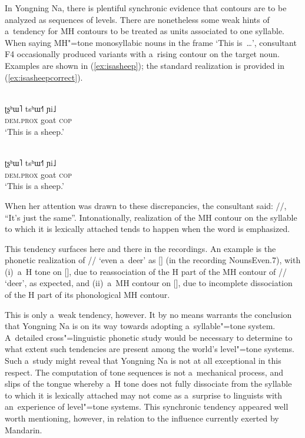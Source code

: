 In Yongning Na, there is plentiful synchronic evidence that contours are to be analyzed as sequences of
levels. There are nonetheless some weak hints of a~tendency for MH contours to be treated as units
associated to one syllable. When saying MH"=tone monosyllabic nouns in the frame ‘This is~{\dots}’,
consultant F4 occasionally produced variants with a~rising {contour} on the target noun. Examples are shown in (\ref{ex:isasheep}); the standard realization is provided in (\ref{ex:isasheepcorrect}).

\begin{exe}
	\ex
	\label{ex:isasheep}
	\\ 
		\gll ʈʂʰɯ˥		tsʰɯ˧˥	ɲi˩\\
		\textsc{dem.prox}	goat	\textsc{cop}\\
		\glt ‘This is a sheep.’ 
\end{exe}

\Hack{\newpage}

\begin{exe}
	\ex
	\label{ex:isasheepcorrect}
	\\ 
	\gll ʈʂʰɯ˥		tsʰɯ˧˥	ɲi˩\\
	\textsc{dem.prox}	goat	\textsc{cop}\\
	\glt ‘This is a sheep.’
\end{exe}

When her attention was
drawn to these discrepancies, the consultant said: //, “It’s just the
same”. Intonationally, realization of the MH contour on the syllable to which it is lexically
attached tends to happen when the word is emphasized.

This tendency surfaces here and there in the recordings. An example is the phonetic realization of // ‘even a~deer’ as
[] (in the recording NounsEven.7), with (i)~a~H tone on [], due to reassociation of the H part of the
MH contour of // ‘deer’, as expected, and (ii)~a~MH {contour} on [], due to
incomplete dissociation of the H part of its phonological MH contour.

This is only a~weak tendency, however. It by no means warrants the conclusion that Yongning Na is on its
way towards adopting a~syllable"=tone system. A~detailed cross"=linguistic phonetic study would be
necessary to determine to what extent such tendencies are present among the world’s level"=tone
systems. Such a~study might reveal that Yongning Na is not at all exceptional in this respect. The
computation of tone sequences is not a~mechanical process, and slips of the tongue whereby
a~H tone does not fully dissociate from the syllable to which it is lexically attached may not come
as a~surprise to linguists with an~experience of level"=tone systems. This synchronic tendency
appeared well worth mentioning, however, in relation to the influence currently exerted by {Mandarin}.


